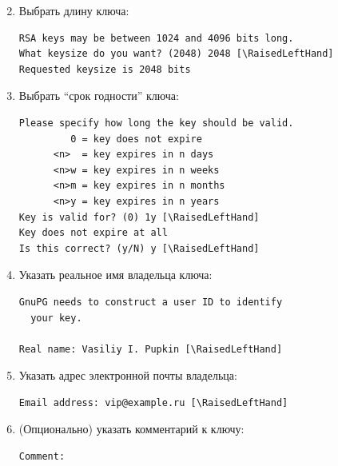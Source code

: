 \documentclass[presentation]{beamer}
\newcommand{\RaisedLeftHand}{%
  \raisebox{-.50em}{\Large\HandLeft}
}
\begin{document}
\begin{frame}[fragile]{}
  \begin{enumerate}
    \setcounter{enumi}{1}
  \item Выбрать длину ключа:
    \small
\begin{Verbatim}[commandchars=\\\[\]]
RSA keys may be between 1024 and 4096 bits long.
What keysize do you want? (2048) 2048 [\RaisedLeftHand]
Requested keysize is 2048 bits
\end{Verbatim}
\normalsize
\item Выбрать ``срок годности'' ключа:
  \small
\begin{Verbatim}[commandchars=\\\[\]]
Please specify how long the key should be valid.
         0 = key does not expire
      <n>  = key expires in n days
      <n>w = key expires in n weeks
      <n>m = key expires in n months
      <n>y = key expires in n years
Key is valid for? (0) 1y [\RaisedLeftHand]
Key does not expire at all
Is this correct? (y/N) y [\RaisedLeftHand]
\end{Verbatim}
\normalsize
    \end{enumerate}
\end{frame}

\begin{frame}[fragile]{}
  \begin{enumerate}
    \setcounter{enumi}{3}
  \item Указать реальное имя владельца ключа:
    \small
\begin{Verbatim}[commandchars=\\\[\]]
GnuPG needs to construct a user ID to identify
  your key.

Real name: Vasiliy I. Pupkin [\RaisedLeftHand]
\end{Verbatim}
  \item Указать адрес электронной почты владельца:
\begin{Verbatim}[commandchars=\\\[\]]
Email address: vip@example.ru [\RaisedLeftHand]
\end{Verbatim}

  \item (Опционально) указать комментарий к ключу:
\begin{Verbatim}[commandchars=\\\[\]]
Comment:
\end{Verbatim}
    \end{enumerate}
\end{frame}
\end{document}
